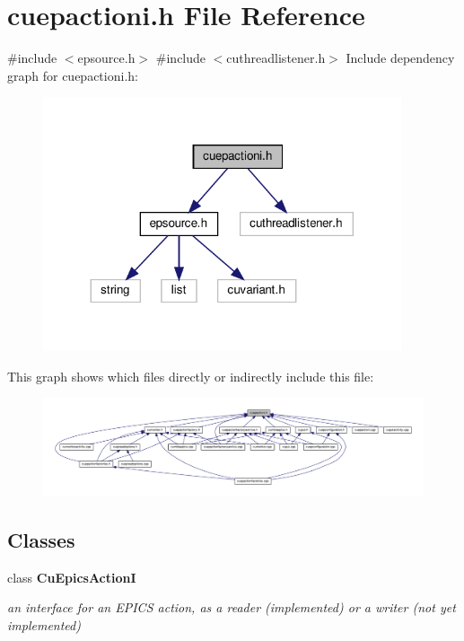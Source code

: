 \section{cuepactioni.\+h File Reference}
\label{cuepactioni_8h}
{\ttfamily \#include $<$epsource.\+h$>$}\newline
{\ttfamily \#include $<$cuthreadlistener.\+h$>$}\newline
Include dependency graph for cuepactioni.\+h\+:\nopagebreak
\begin{figure}[H]
\begin{center}
\leavevmode
\includegraphics[width=299pt]{cuepactioni_8h__incl}
\end{center}
\end{figure}
This graph shows which files directly or indirectly include this file\+:\nopagebreak
\begin{figure}[H]
\begin{center}
\leavevmode
\includegraphics[width=350pt]{cuepactioni_8h__dep__incl}
\end{center}
\end{figure}
\subsection*{Classes}
\begin{DoxyCompactItemize}
\item 
class \textbf{ Cu\+Epics\+ActionI}
\begin{DoxyCompactList}\small\item\em an interface for an E\+P\+I\+CS {\itshape action}, as a reader (implemented) or a writer (not yet implemented) \end{DoxyCompactList}\end{DoxyCompactItemize}

